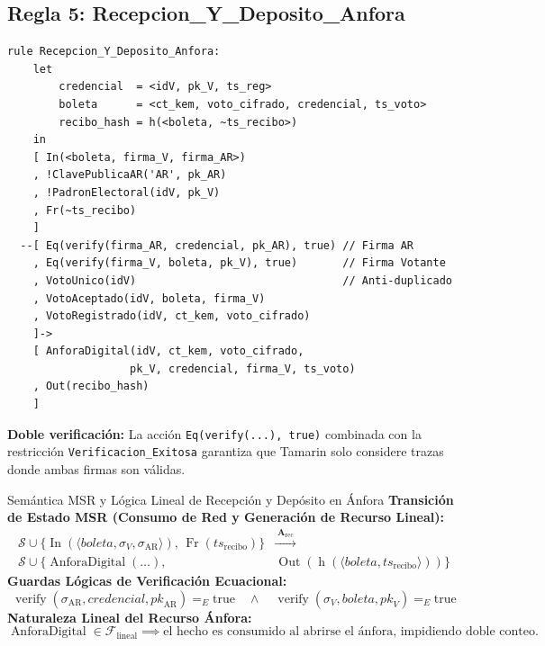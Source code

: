 \documentclass[12pt, a4paper, twoside, openright]{book}
\begin{document}
\subsection{Regla 5: Recepcion\_Y\_Deposito\_Anfora}

\begin{lstlisting}[caption={El SV verifica la boleta y la deposita en el anfora.}]
rule Recepcion_Y_Deposito_Anfora:
    let
        credencial  = <idV, pk_V, ts_reg>
        boleta      = <ct_kem, voto_cifrado, credencial, ts_voto>
        recibo_hash = h(<boleta, ~ts_recibo>)
    in
    [ In(<boleta, firma_V, firma_AR>)
    , !ClavePublicaAR('AR', pk_AR)
    , !PadronElectoral(idV, pk_V)
    , Fr(~ts_recibo)
    ]
  --[ Eq(verify(firma_AR, credencial, pk_AR), true) // Firma AR
    , Eq(verify(firma_V, boleta, pk_V), true)       // Firma Votante
    , VotoUnico(idV)                                // Anti-duplicado
    , VotoAceptado(idV, boleta, firma_V)
    , VotoRegistrado(idV, ct_kem, voto_cifrado)
    ]->
    [ AnforaDigital(idV, ct_kem, voto_cifrado,
                   pk_V, credencial, firma_V, ts_voto)
    , Out(recibo_hash)
    ]
\end{lstlisting}

\textbf{Doble verificaci\'on:} La acci\'on \texttt{Eq(verify(...), true)}
combinada con la restricci\'on \texttt{Verificacion\_Exitosa} garantiza
que Tamarin solo considere trazas donde ambas firmas son v\'alidas.

\begin{cajaLogica}{Sem\'antica MSR y L\'ogica Lineal de Recepci\'on y Dep\'osito en \'Anfora}
  \textbf{Transici\'on de Estado MSR (Consumo de Red y Generaci\'on de Recurso Lineal):}
  \[
    \begin{aligned}
      \mathcal{S} \cup \{ \operatorname{In}(\langle \mathit{boleta}, \sigma_V, \sigma_{\mathrm{AR}} \rangle),\, \operatorname{Fr}(\mathit{ts}_{\text{recibo}}) \}
      &\xrightarrow{\;\mathbf{A}_{\text{rec}}\;} \\
      \mathcal{S} \cup \big\{ \operatorname{AnforaDigital}(\dots),\,
      &\operatorname{Out}(\operatorname{h}(\langle \mathit{boleta}, \mathit{ts}_{\text{recibo}} \rangle)) \big\}
    \end{aligned}
  \]
  \textbf{Guardas L\'ogicas de Verificaci\'on Ecuacional:}
  \[
    \operatorname{verify}(\sigma_{\mathrm{AR}}, \mathit{credencial}, \mathit{pk}_{\mathrm{AR}}) =_E \mathrm{true}
    \quad \land \quad
    \operatorname{verify}(\sigma_V, \mathit{boleta}, \mathit{pk}_V) =_E \mathrm{true}
  \]
  \textbf{Naturaleza Lineal del Recurso \'Anfora:}
  \[
    \operatorname{AnforaDigital} \in \mathcal{F}_{\mathrm{lineal}} \implies
    \text{el hecho es consumido al abrirse el \'anfora, impidiendo doble conteo.}
  \]
\end{cajaLogica}
\end{document}
